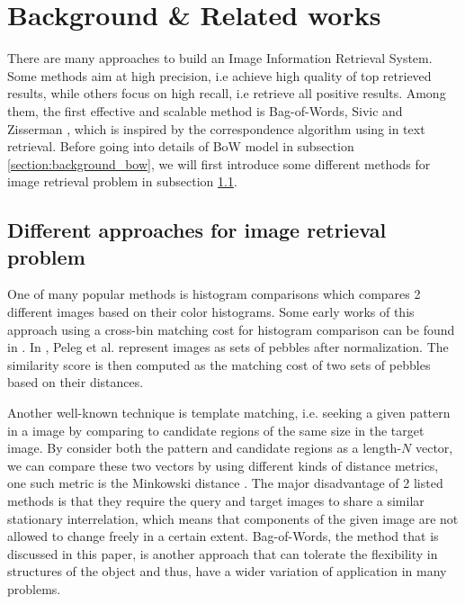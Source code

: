 % 

\section{Background \& Related works} \label{section:background_relatedworks}
There are many approaches to build an Image Information Retrieval System. Some methods aim at high precision, i.e achieve high quality of top retrieved results, while others focus on high recall, i.e retrieve all positive results. Among them, the first effective and scalable method is Bag-of-Words, Sivic and Zisserman \cite{3}, which is inspired by the correspondence algorithm using in text retrieval. Before going into details of BoW model in subsection \ref{section:background_bow}, we will first introduce some different methods for image retrieval problem in subsection \ref{section:background_dif_method}.

\subsection{Different approaches for image retrieval problem} \label{section:background_dif_method}
One of many popular methods is histogram comparisons which compares 2 different images based on their color histograms. Some early works of this approach using a cross-bin matching cost for histogram comparison can be found in \cite{Shen1983187, Werman1985328, Peleg192468}. In \cite{Peleg192468}, Peleg et al. represent images as sets of pebbles after normalization. The similarity score is then computed as the matching cost of two sets of pebbles based on their distances.

Another well-known technique is template matching, i.e. seeking a given pattern in a image by comparing to candidate regions of the same size in the target image. By consider both the pattern and candidate regions as a length-$N$ vector, we can compare these two vectors by using different kinds of distance metrics, one such metric is the Minkowski distance \cite{Ouyang5770267}. The major disadvantage of 2 listed methods is that they require the query and target images to share a similar stationary interrelation, which means that components of the given image are not allowed to change freely in a certain extent. Bag-of-Words, the method that is discussed in this paper, is another approach that can tolerate the flexibility in structures of the object and thus, have a wider variation of application in many problems. 

